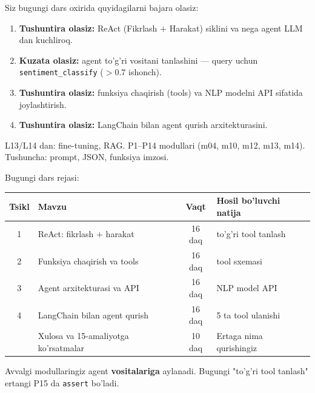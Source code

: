 \documentclass[aspectratio=169,11pt]{beamer}
\begin{document}
\begin{frame}{Siz bugungi dars oxirida quyidagilarni bajara olasiz:}
  \begin{enumerate}\setlength\itemsep{6pt}
    \item \textbf{Tushuntira olasiz:} ReAct (Fikrlash $+$ Harakat) siklini va
          nega agent LLM dan kuchliroq.
    \item \textbf{Kuzata olasiz:} agent to'g'ri vositani tanlashini --- query
          uchun \texttt{sentiment\_classify} ($> 0.7$ ishonch).
    \item \textbf{Tushuntira olasiz:} funksiya chaqirish (tools) va NLP modelni
          API sifatida joylashtirish.
    \item \textbf{Tushuntira olasiz:} LangChain bilan agent qurish arxitekturasini.
  \end{enumerate}
  \vspace{4pt}
  \begin{tcolorbox}[defbox,title=Oldindan talab]
    \footnotesize
    L13/L14 dan: fine-tuning, RAG. P1--P14 modullari (m04, m10, m12, m13, m14).
    Tushuncha: prompt, JSON, funksiya imzosi.
  \end{tcolorbox}
\end{frame}

\begin{frame}{Bugungi dars rejasi:}
  \begin{center}
  \small
  \begin{tabular}{c p{5.2cm} c p{3.0cm}}
    \toprule
    \textbf{Tsikl}& \textbf{Mavzu} & \textbf{Vaqt} & \textbf{Hosil bo'luvchi natija}\\
    \midrule
    1 & ReAct: fikrlash $+$ harakat & 16 daq & to'g'ri tool tanlash \\
    2 & Funksiya chaqirish va tools & 16 daq & tool sxemasi \\
    3 & Agent arxitekturasi va API & 16 daq & NLP model API \\
    4 & LangChain bilan agent qurish & 16 daq & 5 ta tool ulanishi \\
    \midrule
      & Xulosa va 15-amaliyotga ko'rsatmalar & 10 daq & Ertaga nima qurishingiz \\
    \bottomrule
  \end{tabular}
  \end{center}
  \vspace{4pt}
  \begin{tcolorbox}[warnbox,title=Bu dars agent tizimiga olib keladi]
    \footnotesize\sloppy
    Avvalgi modullaringiz agent \textbf{vositalariga} aylanadi. Bugungi
    "to'g'ri tool tanlash" ertangi P15 da \texttt{assert} bo'ladi.
  \end{tcolorbox}
\end{frame}
\end{document}

